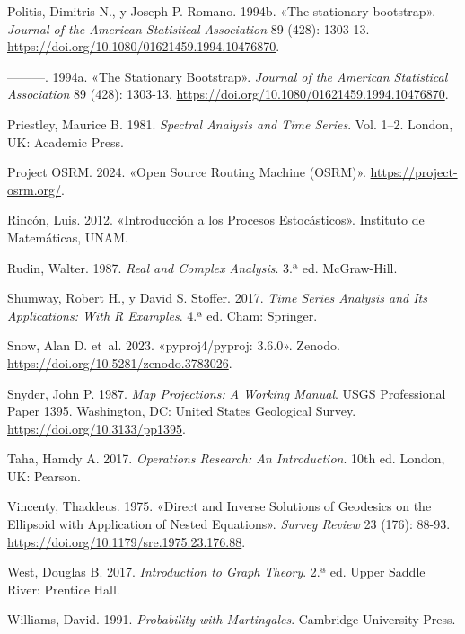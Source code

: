\documentclass[
  spanish,
  us-letterpaper,
]{scrreprt}
\newlength{\cslhangindent}
\newenvironment{CSLReferences}[2] %
 {\begin{list}{}{%
  \setlength{\itemindent}{0pt}
  \setlength{\leftmargin}{0pt}
  \setlength{\parsep}{0pt}
  \ifodd #1
   \setlength{\leftmargin}{\cslhangindent}
   \setlength{\itemindent}{-1\cslhangindent}
  \fi
  \setlength{\itemsep}{#2\baselineskip}}}
 {\end{list}}
\numberwithin{equation}{section}
\begin{document}
\begin{CSLReferences}{1}{0}
Politis, Dimitris N., y Joseph P. Romano. 1994b. {«The stationary
bootstrap»}. \emph{Journal of the American Statistical Association} 89
(428): 1303-13. \url{https://doi.org/10.1080/01621459.1994.10476870}.

---------. 1994a. {«The Stationary Bootstrap»}. \emph{Journal of the
American Statistical Association} 89 (428): 1303-13.
\url{https://doi.org/10.1080/01621459.1994.10476870}.

Priestley, Maurice B. 1981. \emph{Spectral Analysis and Time Series}.
Vol. 1--2. London, UK: Academic Press.

Project OSRM. 2024. {«Open Source Routing Machine (OSRM)»}.
\url{https://project-osrm.org/}.

Rincón, Luis. 2012. {«Introducción a los Procesos Estocásticos»}.
Instituto de Matemáticas, UNAM.

Rudin, Walter. 1987. \emph{Real and Complex Analysis}. 3.ª ed.
McGraw-Hill.

Shumway, Robert H., y David S. Stoffer. 2017. \emph{Time Series Analysis
and Its Applications: With R Examples}. 4.ª ed. Cham: Springer.

Snow, Alan D. et~al. 2023. {«pyproj4/pyproj: 3.6.0»}. Zenodo.
\url{https://doi.org/10.5281/zenodo.3783026}.

Snyder, John P. 1987. \emph{Map Projections: A Working Manual}. USGS
Professional Paper 1395. Washington, DC: United States Geological
Survey. \url{https://doi.org/10.3133/pp1395}.

Taha, Hamdy A. 2017. \emph{Operations Research: An Introduction}. 10th
ed. London, UK: Pearson.

Vincenty, Thaddeus. 1975. {«Direct and Inverse Solutions of Geodesics on
the Ellipsoid with Application of Nested Equations»}. \emph{Survey
Review} 23 (176): 88-93.
\url{https://doi.org/10.1179/sre.1975.23.176.88}.

West, Douglas B. 2017. \emph{Introduction to Graph Theory}. 2.ª ed.
Upper Saddle River: Prentice Hall.

Williams, David. 1991. \emph{Probability with Martingales}. Cambridge
University Press.

\end{CSLReferences}
\end{document}
